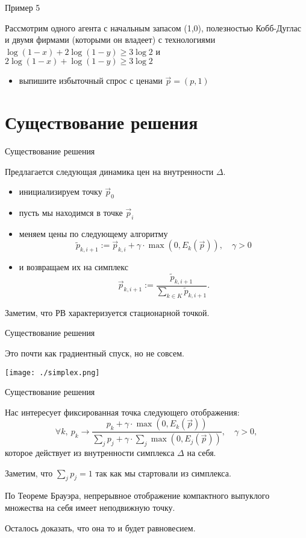 \documentclass{beamer}
\begin{document}
\begin{frame}{Пример 5}

Рассмотрим одного агента с начальным запасом (1,0), полезностью Кобб-Дуглас и двумя фирмами (которыми он владеет) с технологиями $\log(1-x) + 2\log(1-y) \geqslant 3 \log 2$ и $2 \log(1-x) + \log(1-y) \geqslant 3 \log 2$
\begin{itemize}
  \item выпишите избыточный спрос с ценами $\vec p = (p,1)$
\end{itemize}

\end{frame}

\section{Существование решения}

\begin{frame}{Существование решения}

Предлагается следующая динамика цен на внутренности $\Delta$.

\begin{itemize}
  \item инициализируем точку $\vec p_0$
  \item пусть мы находимся в точке $\vec p_{i}$
  \item меняем цены по следующему алгоритму
$$ \tilde p_{k, i+1} := \vec p_{k, i} + \gamma \cdot \max(0, E_k(\vec p)), \quad \gamma >0$$
  \item и возвращаем их на симплекс
$$ \vec p_{k, i+1} := \frac{\tilde p_{k, i+1}}{\sum_{k \in K} \tilde p_{k, i+1}}.$$
\end{itemize}

Заметим, что РВ характеризуется стационарной точкой.

\end{frame}

\begin{frame}{Существование решения}

Это почти как градиентный спуск, но не совсем.

\begin{center}
     \texttt{[image: ./simplex.png]}
     \end{center}

\end{frame}

\begin{frame}{Существование решения}

Нас интересует фиксированная точка следующего отображения:
$$ \forall k, \ p_k \to \frac{p_k + \gamma \cdot \max(0, E_k(\vec p))}{\sum_j p_j + \gamma \cdot \sum_j \max(0, E_j(\vec p))}, \quad \gamma > 0,$$
которое действует из внутренности симплекса $\Delta$ на себя.

Заметим, что $\sum_j p_j = 1$ так как мы стартовали из симплекса.

По \alert{Теореме Брауэра}, непрерывное отображение компактного выпуклого множества на себя имеет неподвижную точку.

Осталось доказать, что она то и будет равновесием.

\end{frame}
\end{document}
